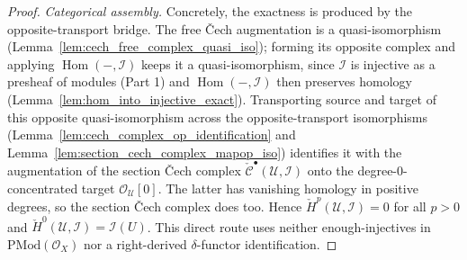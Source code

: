 \begin{proof}
  \emph{Categorical assembly.} Concretely, the exactness is produced by the
  opposite-transport bridge. The free {\v C}ech augmentation is a quasi-isomorphism
  (Lemma~\ref{lem:cech_free_complex_quasi_iso}); forming its opposite complex and
  applying \(\operatorname{Hom}(-, \mathcal{I})\) keeps it a quasi-isomorphism, since
  \(\mathcal{I}\) is injective as a presheaf of modules (Part 1) and
  \(\operatorname{Hom}(-, \mathcal{I})\) then preserves homology
  (Lemma~\ref{lem:hom_into_injective_exact}). Transporting source and target of this
  opposite quasi-isomorphism across the opposite-transport isomorphisms
  (Lemma~\ref{lem:cech_complex_op_identification} and
  Lemma~\ref{lem:section_cech_complex_mapop_iso}) identifies it with the augmentation
  of the section {\v C}ech complex \(\check{\mathcal{C}}^\bullet(\mathcal{U},
  \mathcal{I})\) onto the degree-\(0\)-concentrated target \(\mathcal{O}_{\mathcal{U}}[0]\).
  The latter has vanishing homology in positive degrees, so the section {\v C}ech complex
  does too. Hence \(\check{H}^p(\mathcal{U}, \mathcal{I}) = 0\) for all \(p > 0\) and
  \(\check{H}^0(\mathcal{U}, \mathcal{I}) = \mathcal{I}(U)\). This direct route uses
  neither enough-injectives in \(\mathrm{PMod}(\mathcal{O}_X)\) nor a right-derived
  \(\delta\)-functor identification.
\end{proof}

